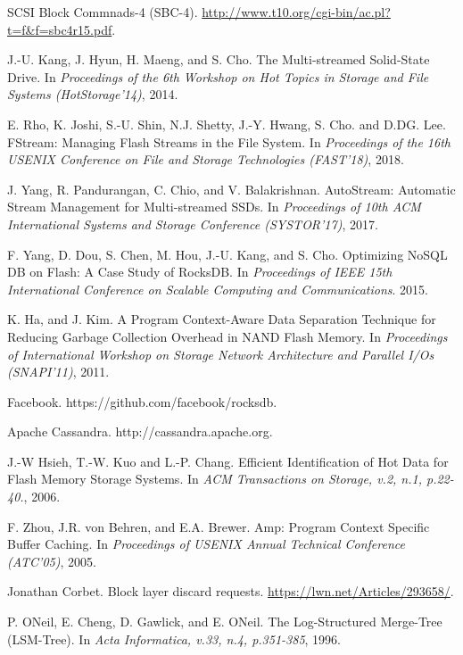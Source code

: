 

\begin{thebibliography}{00}

SCSI Block Commnads-4 (SBC-4).
\url{http://www.t10.org/cgi-bin/ac.pl?t=f&f=sbc4r15.pdf}.

J.-U. Kang, J. Hyun, H. Maeng, and S. Cho. The Multi-streamed Solid-State Drive.
In \textit{Proceedings of the 6th Workshop on Hot Topics in Storage and File Systems (HotStorage'14)}, 2014.


E. Rho, K. Joshi, S.-U. Shin, N.J. Shetty, J.-Y. Hwang, S. Cho. and D.DG. Lee. 
FStream: Managing Flash Streams in the File System.
In \textit{Proceedings of the 16th USENIX Conference on File and Storage Technologies (FAST'18)}, 2018.

J. Yang, R. Pandurangan, C. Chio, and V. Balakrishnan.
AutoStream: Automatic Stream Management for Multi-streamed SSDs.
In \textit{Proceedings of 10th ACM International Systems and Storage Conference (SYSTOR'17)}, 2017.

F. Yang, D. Dou, S. Chen, M. Hou, J.-U. Kang, and S. Cho.
Optimizing NoSQL DB on Flash: A Case Study of RocksDB.
In \textit{Proceedings of IEEE 15th International Conference on Scalable Computing
and Communications}. 2015.

K. Ha, and J. Kim.
A Program Context-Aware Data Separation Technique for Reducing Garbage Collection Overhead in NAND Flash Memory.
In \textit{Proceedings of International Workshop on Storage Network Architecture 
and Parallel I/Os (SNAPI'11)}, 2011.

Facebook. https://github.com/facebook/rocksdb.

Apache Cassandra. http://cassandra.apache.org.

J.-W Hsieh, T.-W. Kuo and L.-P. Chang.
Efficient Identification of Hot Data for Flash Memory Storage Systems.
In \textit{ACM Transactions on Storage, v.2, n.1, p.22-40.}, 2006.

F. Zhou, J.R. von Behren, and E.A. Brewer.
Amp: Program Context Specific Buffer Caching.
In \textit{Proceedings of USENIX Annual Technical Conference (ATC'05)}, 2005.

Jonathan Corbet.
Block layer discard requests.
\url{https://lwn.net/Articles/293658/}.

P. ONeil, E. Cheng, D. Gawlick, and E. ONeil.
The Log-Structured Merge-Tree (LSM-Tree).
In \textit{Acta Informatica, v.33, n.4, p.351-385}, 1996.


\end{thebibliography}
